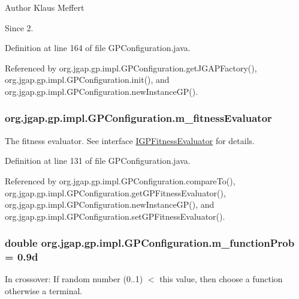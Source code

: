 \begin{DoxyAuthor}{Author}
Klaus Meffert 
\end{DoxyAuthor}
\begin{DoxySince}{Since}
2. 
\end{DoxySince}


Definition at line 164 of file G\-P\-Configuration.\-java.



Referenced by org.\-jgap.\-gp.\-impl.\-G\-P\-Configuration.\-get\-J\-G\-A\-P\-Factory(), org.\-jgap.\-gp.\-impl.\-G\-P\-Configuration.\-init(), and org.\-jgap.\-gp.\-impl.\-G\-P\-Configuration.\-new\-Instance\-G\-P().

\hypertarget{classorg_1_1jgap_1_1gp_1_1impl_1_1_g_p_configuration_a8dddac3118db00561c4b7ce46a300861}{
\subsubsection[{m\-\_\-fitness\-Evaluator}]{ org.\-jgap.\-gp.\-impl.\-G\-P\-Configuration.\-m\-\_\-fitness\-Evaluator\hspace{0.3cm}{\ttfamily [private]}}}\label{classorg_1_1jgap_1_1gp_1_1impl_1_1_g_p_configuration_a8dddac3118db00561c4b7ce46a300861}
The fitness evaluator. See interface \hyperlink{interfaceorg_1_1jgap_1_1gp_1_1_i_g_p_fitness_evaluator}{I\-G\-P\-Fitness\-Evaluator} for details. 

Definition at line 131 of file G\-P\-Configuration.\-java.



Referenced by org.\-jgap.\-gp.\-impl.\-G\-P\-Configuration.\-compare\-To(), org.\-jgap.\-gp.\-impl.\-G\-P\-Configuration.\-get\-G\-P\-Fitness\-Evaluator(), org.\-jgap.\-gp.\-impl.\-G\-P\-Configuration.\-new\-Instance\-G\-P(), and org.\-jgap.\-gp.\-impl.\-G\-P\-Configuration.\-set\-G\-P\-Fitness\-Evaluator().

\hypertarget{classorg_1_1jgap_1_1gp_1_1impl_1_1_g_p_configuration_a2bfa04104b91d80536f11ce85999f100}{
\subsubsection[{m\-\_\-function\-Prob}]{\setlength{\rightskip}{0pt plus 5cm}double org.\-jgap.\-gp.\-impl.\-G\-P\-Configuration.\-m\-\_\-function\-Prob = 0.\-9d\hspace{0.3cm}{\ttfamily [private]}}}\label{classorg_1_1jgap_1_1gp_1_1impl_1_1_g_p_configuration_a2bfa04104b91d80536f11ce85999f100}
In crossover\-: If random number (0..1) $<$ this value, then choose a function otherwise a terminal. 

